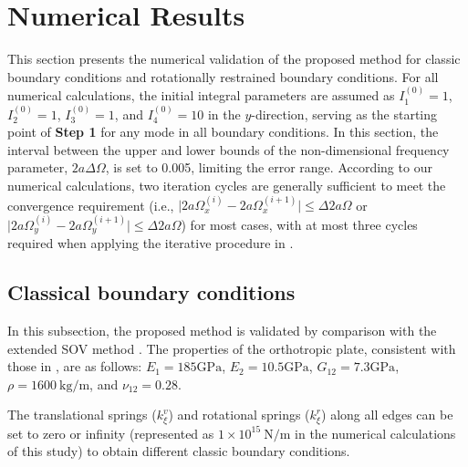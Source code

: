 \documentclass[preprint,12pt]{elsarticle}
\newcommand{\urho}{~\unit{\kilogram\per\meter}\xspace}
\newcommand{\ustif}{~\unit{\newton\per\metre}\xspace}
\newcommand{\nugpa}{\si{\giga\pascal}\xspace}
\begin{document}
\FloatBarrier
\section{Numerical Results}  
This section presents the numerical validation of the proposed method for classic boundary conditions and rotationally restrained boundary conditions.  
For all numerical calculations, the initial integral parameters are assumed as $I^{(0)}_1=1$, $I^{(0)}_2=1$, $I^{(0)}_3=1$, and $I^{(0)}_4=10$ in the $y$-direction, serving as the starting point of \textbf{Step 1} for any mode in all boundary conditions.  
In this section, the interval between the upper and lower bounds of the non-dimensional frequency parameter, $2a\Delta\Omega$, is set to 0.005, limiting the error range.  
According to our numerical calculations, two iteration cycles are generally sufficient to meet the convergence requirement (i.e., $\lvert 2a\Omega^{(i)}_{x} - 2a\Omega^{(i+1)}_{x} \rvert \leq \Delta 2a\Omega$ or $\lvert 2a\Omega^{(i)}_{y} - 2a\Omega^{(i+1)}_{y} \rvert \leq \Delta 2a\Omega$) for most cases, with at most three cycles required when applying the iterative procedure in .
 
 

\subsection{Classical boundary conditions}
In this subsection, the proposed method is validated by comparison with the extended SOV method \cite{xing2020extended}.  
The properties of the orthotropic plate, consistent with those in \cite{xing2020extended}, are as follows:  
$E_1 = 185 \nugpa$, $E_2 = 10.5 \nugpa$, $G_{12} = 7.3 \nugpa$, $\rho = 1600 \urho$, and $\nu_{12} = 0.28$.
  
The translational springs ($k^v_\xi$) and rotational springs ($k^r_\xi$) along all edges can be set to zero or infinity (represented as $1 \times 10^{15} \ustif$ in the numerical calculations of this study) to obtain different classic boundary conditions.  
\end{document}
